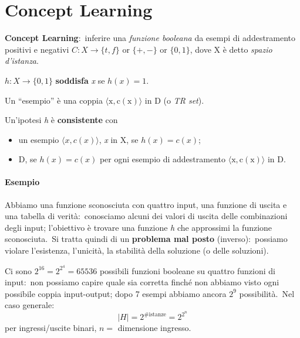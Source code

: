 \chapter{Concept Learning}

\textbf{Concept Learning}:\ inferire una \textit{funzione booleana} da esempi di addestramento positivi e negativi $C: X \rightarrow \{t, f\}$ or $\{+, -\}$ or $\{0,1\}$, dove X è detto \textit{spazio d'istanza}.\

\begin{definition}
	$h: X \rightarrow \{0,1\}$ \textbf{soddisfa} \textit{x} se $h(x)=1$.
\end{definition}

\begin{definition}
	Un ``esempio'' è una coppia $\langle \mathrm{x,c(x)} \rangle$ in D (o \textit{TR set}).
\end{definition}

\begin{definition}
	Un'ipotesi \textit{h} è \textbf{consistente} con
	\begin{itemize}
		\item un esempio $\langle x,c(x) \rangle$, \textit{x} in X, se $h(x)=c(x)$;
		\item D, se $h(x)=c(x)$ per ogni esempio di addestramento $\langle \mathrm{x,c(x)} \rangle$ in D.
	\end{itemize}
\end{definition}

\subsubsection{Esempio}

Abbiamo una funzione sconosciuta con quattro input, una funzione di uscita e una tabella di verità:\ conosciamo alcuni dei valori di uscita delle combinazioni degli input; l'obiettivo è trovare una funzione \textit{h} che approssimi la funzione sconosciuta.\
Si tratta quindi di un \textbf{problema mal posto} (inverso):\ possiamo violare l'esistenza, l'unicità, la stabilità della soluzione (o delle soluzioni).\

\noindent Ci sono $2^{16} = 2^{2^4} = 65536$ possibili funzioni booleane su quattro funzioni di input:\ non possiamo capire quale sia corretta finché non abbiamo visto ogni possibile coppia input-output; dopo 7 esempi abbiamo ancora $2^9$ possibilità.\
Nel caso generale:\
\[ |H| = 2^{\# \mathrm{istanze}} = 2^{2^n} \]
per ingressi/uscite binari, $n =$ dimensione ingresso.

